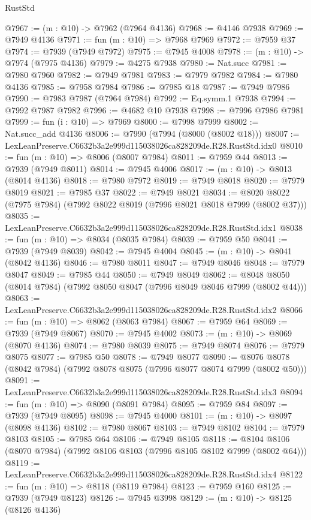 \begin{lexlean}{RustStd}
\begin{coremodule}
@7967 := (m : @10) -> @7962 (@7964 @4136)
@7968 := @4146 @7938
@7969 := @7949 @4136
@7971 := fun (m : @10) => @7968 @7969
@7972 := @7959 @37
@7974 := @7939 (@7949 @7972)
@7975 := @7945 @4008
@7978 := (m : @10) -> @7974 (@7975 @4136)
@7979 := @4275 @7938
@7980 := Nat.succ
@7981 := @7980 @7960
@7982 := @7949 @7981
@7983 := @7979 @7982
@7984 := @7980 @4136
@7985 := @7958 @7984
@7986 := @7985 @18
@7987 := @7949 @7986
@7990 := @7983 @7987 (@7964 @7984)
@7992 := Eq.symm.{1} @7938
@7994 := @7992 @7987 @7982
@7996 := @4682 @10 @7938
@7998 := @7996 @7986 @7981
@7999 := fun (i : @10) => @7969
@8000 := @7998 @7999
@8002 := Nat.succ_add @4136
@8006 := @7990 (@7994 (@8000 (@8002 @18)))
@8007 := LexLeanPreserve.C6632b3a2e999d115038026ca828209de.R28.RustStd.idx0
@8010 := fun (m : @10) => @8006 (@8007 @7984)
@8011 := @7959 @44
@8013 := @7939 (@7949 @8011)
@8014 := @7945 @4006
@8017 := (m : @10) -> @8013 (@8014 @4136)
@8018 := @7980 @7972
@8019 := @7949 @8018
@8020 := @7979 @8019
@8021 := @7985 @37
@8022 := @7949 @8021
@8034 := @8020 @8022 (@7975 @7984) (@7992 @8022 @8019 (@7996 @8021 @8018 @7999 (@8002 @37)))
@8035 := LexLeanPreserve.C6632b3a2e999d115038026ca828209de.R28.RustStd.idx1
@8038 := fun (m : @10) => @8034 (@8035 @7984)
@8039 := @7959 @50
@8041 := @7939 (@7949 @8039)
@8042 := @7945 @4004
@8045 := (m : @10) -> @8041 (@8042 @4136)
@8046 := @7980 @8011
@8047 := @7949 @8046
@8048 := @7979 @8047
@8049 := @7985 @44
@8050 := @7949 @8049
@8062 := @8048 @8050 (@8014 @7984) (@7992 @8050 @8047 (@7996 @8049 @8046 @7999 (@8002 @44)))
@8063 := LexLeanPreserve.C6632b3a2e999d115038026ca828209de.R28.RustStd.idx2
@8066 := fun (m : @10) => @8062 (@8063 @7984)
@8067 := @7959 @64
@8069 := @7939 (@7949 @8067)
@8070 := @7945 @4002
@8073 := (m : @10) -> @8069 (@8070 @4136)
@8074 := @7980 @8039
@8075 := @7949 @8074
@8076 := @7979 @8075
@8077 := @7985 @50
@8078 := @7949 @8077
@8090 := @8076 @8078 (@8042 @7984) (@7992 @8078 @8075 (@7996 @8077 @8074 @7999 (@8002 @50)))
@8091 := LexLeanPreserve.C6632b3a2e999d115038026ca828209de.R28.RustStd.idx3
@8094 := fun (m : @10) => @8090 (@8091 @7984)
@8095 := @7959 @84
@8097 := @7939 (@7949 @8095)
@8098 := @7945 @4000
@8101 := (m : @10) -> @8097 (@8098 @4136)
@8102 := @7980 @8067
@8103 := @7949 @8102
@8104 := @7979 @8103
@8105 := @7985 @64
@8106 := @7949 @8105
@8118 := @8104 @8106 (@8070 @7984) (@7992 @8106 @8103 (@7996 @8105 @8102 @7999 (@8002 @64)))
@8119 := LexLeanPreserve.C6632b3a2e999d115038026ca828209de.R28.RustStd.idx4
@8122 := fun (m : @10) => @8118 (@8119 @7984)
@8123 := @7959 @160
@8125 := @7939 (@7949 @8123)
@8126 := @7945 @3998
@8129 := (m : @10) -> @8125 (@8126 @4136)

\end{coremodule}
\end{lexlean}
